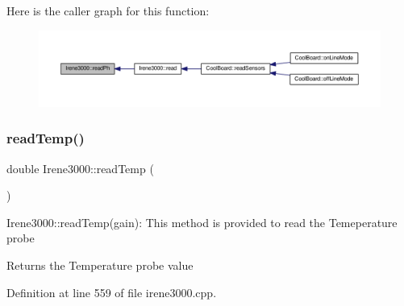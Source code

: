 Here is the caller graph for this function\+:\nopagebreak
\begin{figure}[H]
\begin{center}
\leavevmode
\includegraphics[width=350pt]{d6/d03/class_irene3000_a436fc0a06681cd0784aba56b9707f19a_icgraph}
\end{center}
\end{figure}
\mbox{\label{class_irene3000_a80bc6dfea106dc3bc54fa20204d4d5dc}} 
\subsubsection{\texorpdfstring{read\+Temp()}{readTemp()}}
{\footnotesize\ttfamily double Irene3000\+::read\+Temp (\begin{DoxyParamCaption}{ }\end{DoxyParamCaption})}

Irene3000\+::read\+Temp(gain)\+: This method is provided to read the Temeperature probe

\begin{DoxyReturn}{Returns}
the Temperature probe value 
\end{DoxyReturn}


Definition at line 559 of file irene3000.\+cpp.


